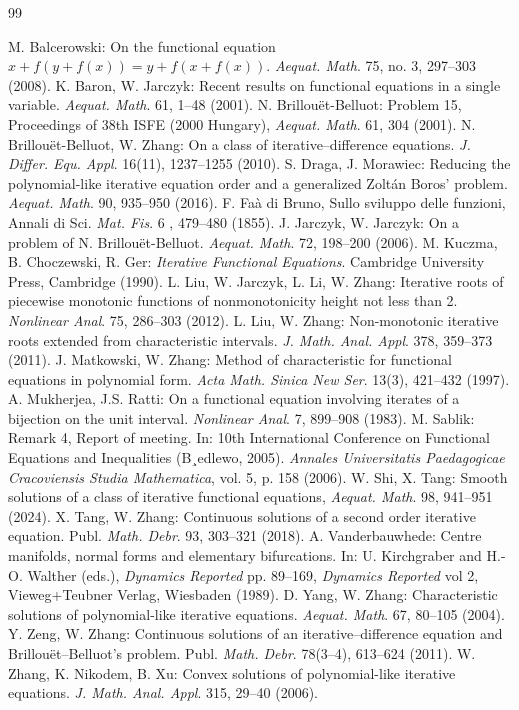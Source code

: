 \documentclass[11pt,reqno,a4paper]{amsart}
\numberwithin{equation}{section}
\begin{document}
\begin{thebibliography}{99}

M. Balcerowski:  On the functional equation $x+f(y+f(x))=y+f(x+f(x))$. {\it Aequat. Math}. 75, no. 3, 297–303 (2008).
K. Baron, W. Jarczyk: Recent results on functional equations in a single variable. {\it Aequat. Math}. 61, 1–48 (2001).
 N. Brillou\"{e}t-Belluot: Problem 15, Proceedings of 38th ISFE (2000 Hungary), {\it Aequat. Math}. 61, 304 (2001).
 N. Brillou\"{e}t-Belluot, W. Zhang: On a class of iterative–diﬀerence equations. {\it J. Diﬀer. Equ. Appl}. 16(11), 1237–1255 (2010).
S. Draga, J. Morawiec: Reducing the polynomial-like iterative equation order and a generalized Zolt\'an Boros’ problem. {\it Aequat. Math}. 90, 935–950 (2016).
 F. Fa\`a di Bruno, Sullo sviluppo delle funzioni, Annali di Sci. {\it Mat. Fis}. 6 , 479–480 (1855).
J. Jarczyk, W. Jarczyk: On a problem of N. Brillou\"{e}t-Belluot. {\it Aequat. Math}. 72, 198–200 (2006).
M. Kuczma, B. Choczewski, R. Ger: {\it Iterative Functional Equations}. Cambridge University Press, Cambridge (1990).
L. Liu, W. Jarczyk, L. Li, W. Zhang: Iterative roots of piecewise monotonic functions of nonmonotonicity height not less than 2. {\it Nonlinear Anal}. 75, 286–303 (2012).
L. Liu, W. Zhang: Non-monotonic iterative roots extended from characteristic intervals. {\it J. Math. Anal. Appl}. 378, 359–373 (2011).
J. Matkowski, W. Zhang: Method of characteristic for functional equations in polynomial form. {\it Acta Math. Sinica New Ser}. 13(3), 421–432 (1997).
 A. Mukherjea, J.S. Ratti: On a functional equation involving iterates of a bijection on the unit interval. {\it Nonlinear Anal}. 7, 899–908 (1983).
 M. Sablik: Remark 4, Report of meeting. In: 10th International Conference on Functional Equations and Inequalities (B¸edlewo, 2005). {\it Annales Universitatis Paedagogicae Cracoviensis Studia Mathematica}, vol. 5, p. 158 (2006).
W. Shi, X. Tang: Smooth solutions of a class of iterative functional equations, {\it Aequat. Math}. 98, 941–951 (2024).
X. Tang, W. Zhang: Continuous solutions of a second order iterative equation. Publ. {\it Math. Debr}. 93, 303–321 (2018).
A. Vanderbauwhede: Centre manifolds, normal forms and elementary bifurcations. In: U. Kirchgraber and H.-O. Walther (eds.), {\it Dynamics Reported} pp. 89–169, {\it Dynamics Reported} vol 2, Vieweg+Teubner Verlag, Wiesbaden (1989).
D. Yang, W. Zhang: Characteristic solutions of polynomial-like iterative equations. {\it Aequat. Math}. 67, 80–105 (2004).
Y. Zeng, W. Zhang: Continuous solutions of an iterative–diﬀerence equation and Brillou\"{e}t–Belluot’s problem. Publ. {\it Math. Debr}. 78(3–4), 613–624 (2011).
 W. Zhang, K. Nikodem, B. Xu: Convex solutions of polynomial-like iterative equations. {\it J. Math. Anal. Appl}. 315, 29–40 (2006).
\end{thebibliography}
\end{document}
